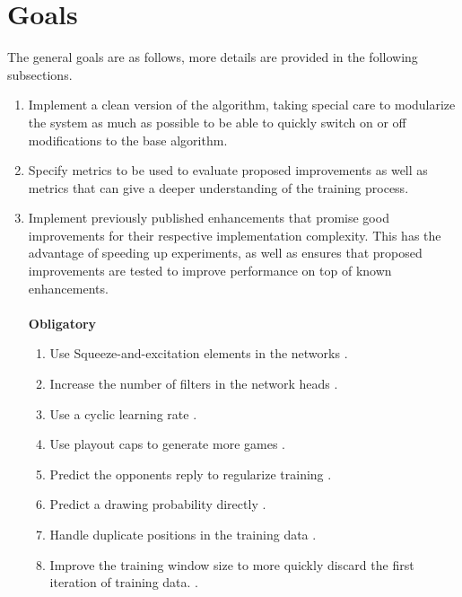 \documentclass[12pt,onecolumn,oneside,titlepage]{article}
\begin{document}
\section{Goals}

The general goals are as follows, more details are provided in the following subsections.

\begin{enumerate}
 \item Implement a clean version of the algorithm, taking special care to modularize the system as much as possible to be able to quickly switch on or off modifications to the base algorithm.
 
 \item Specify metrics to be used to evaluate proposed improvements as well as metrics that can give a deeper understanding of the training process.
 
 \item Implement previously published enhancements that promise good improvements for their respective implementation complexity. This has the advantage of speeding up experiments, as well as ensures that proposed improvements are tested to improve performance on top of known enhancements.
 \\\\
 \textbf{Obligatory}
\begin{enumerate}
 \item Use Squeeze-and-excitation elements in the networks \cite{hu2018squeeze}.
 \item Increase the number of filters in the network heads \cite{oracledevs6}.
 \item Use a cyclic learning rate \cite{oracledevs6}.
 \item Use playout caps to generate more games \cite{wu2019accelerating}.
 \item Predict the opponents reply to regularize training \cite{wu2019accelerating}.
 \item Predict a drawing probability directly \cite{leela0wdl}.
 \item Handle duplicate positions in the training data \cite{oracledevs6}.
 \item Improve the training window size to more quickly discard the first iteration of training data. \cite{oracledevs6}.
\end{enumerate}



\end{enumerate}
\end{document}
